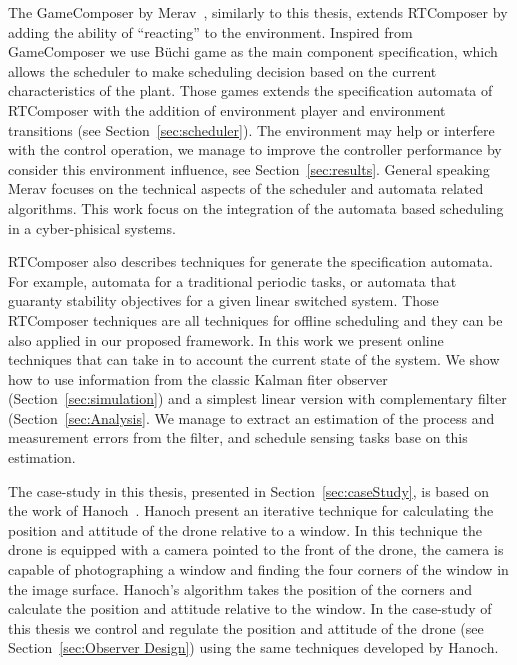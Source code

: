 \documentclass[ twoside, 12pt ]{article}
\newcommand{\buchi}{B\"uchi }
\begin{document}
The GameComposer by Merav~\cite{Merav}, similarly to this thesis, extends RTComposer by adding the ability of ``reacting'' to the environment.
Inspired from GameComposer we use \buchi game as the main component specification, which allows the scheduler to make scheduling decision based on the current characteristics of the plant.
Those games extends the specification automata of RTComposer with the addition of environment player and environment transitions (see Section~\ref{sec:scheduler}).
The environment may help or interfere with the control operation, we manage to improve the controller performance by consider this environment influence, see Section~\ref{sec:results}.
General speaking Merav focuses on the technical aspects of the scheduler and automata related algorithms.
This work focus on the integration of the automata based scheduling in a cyber-phisical systems.

RTComposer also describes techniques for generate the specification automata. For example, automata for a traditional periodic tasks, or automata that guaranty stability objectives for a given linear switched system.
Those RTComposer techniques are all techniques for offline scheduling and they can be also applied in our proposed framework.
In this work we present online techniques that can take in to account the current state of the system.
We show how to use information from the classic Kalman fiter observer (Section~\ref{sec:simulation}) and a simplest linear version with complementary filter (Section~\ref{sec:Analysis}.
We manage to extract an estimation of the process and measurement errors from the filter, and schedule sensing tasks base on this estimation.






The case-study in this thesis, presented in Section~\ref{sec:caseStudy},  is based on the work of Hanoch~\cite{Hanoch ??}.
Hanoch present an iterative technique for calculating the position and attitude of the drone relative to a window.
In this technique the drone is equipped with a camera pointed to the front of the drone, the camera is capable of photographing a window and finding the four corners of the window in the image surface.
Hanoch's algorithm takes the position of the corners and calculate the position and attitude relative to the window.
In the case-study of this thesis we control and regulate the position and attitude of the drone (see Section~\ref{sec:Observer Design}) using the same techniques developed by Hanoch.
\end{document}
